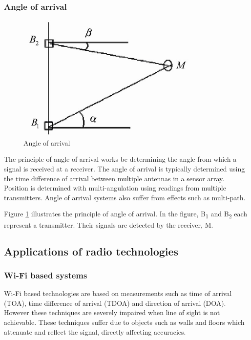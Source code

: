 \documentclass[11pt,a4paper]{report}
\begin{document}
		\subsubsection{Angle of arrival}
			\begin{figure}[h!]
				\centering
				\includegraphics[width=0.8\textwidth]{angle_of_arrival}
				\caption{Angle of arrival}
				\label{fig:angle_of_arrival}
			\end{figure}
			The principle of angle of arrival works be determining the angle from which a signal is received at a receiver. The angle of arrival is typically determined using the time difference of arrival between multiple antennas in a sensor array. Position is determined with multi-angulation using readings from multiple transmitters.
			Angle of arrival systems also suffer from effects such as multi-path.
			
			Figure \ref{fig:angle_of_arrival} illustrates the principle of angle of arrival. In the figure, B\textsubscript{1} and B\textsubscript{2} each represent a transmitter. Their signals are detected by the receiver, M.
			
	\subsection{Applications of radio technologies}
		\subsubsection{Wi-Fi based systems}
			Wi-Fi based technologies are based on measurements such as time of arrival (TOA), time difference of arrival (TDOA) and direction of arrival (DOA). However these techniques are severely impaired when line of sight is not achievable. 
			These techniques suffer due to objects such as walls and floors which attenuate and reflect the signal, directly affecting accuracies.
		
\end{document}
